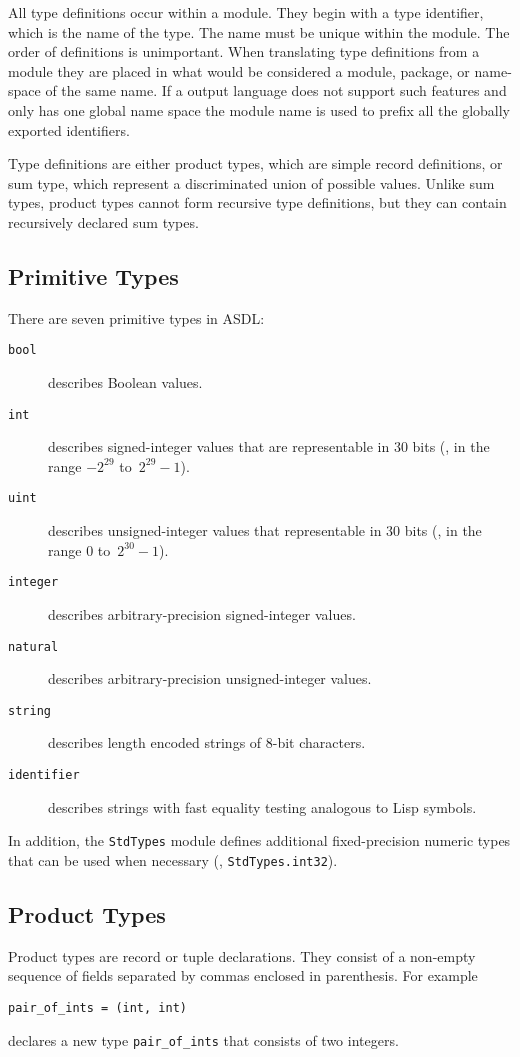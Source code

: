 All type definitions occur within a module.  They begin with a type
identifier, which is the name of the type. The name must be unique within the
module. The order of definitions is unimportant. When translating type
definitions from a module they are placed in what would be considered a
module, package, or name-space of the same name. If a output language does
not support such features and only has one global name space the module name
is used to prefix all the globally exported identifiers.

Type definitions are either product types, which are simple record definitions,
or sum type, which represent a discriminated union of possible values. Unlike
sum types, product types cannot form recursive type definitions, but they can
contain recursively declared sum types.

\subsection{Primitive Types}
There are seven primitive types in ASDL:
\begin{description}
  \item[\normalfont\texttt{\color{\cdColor}bool}] describes Boolean values.
  \item[\normalfont\texttt{\color{\cdColor}int}] describes signed-integer values that are representable in 30 bits
    (\ie{}, in the range ${-}2^{29}$ to~\mbox{$2^{29}-1$}).
  \item[\normalfont\texttt{\color{\cdColor}uint}] describes unsigned-integer values that representable in 30 bits
    (\ie{}, in the range $0$ to~$2^{30}-1$).
  \item[\normalfont\texttt{\color{\cdColor}integer}] describes arbitrary-precision signed-integer values.
  \item[\normalfont\texttt{\color{\cdColor}natural}] describes arbitrary-precision unsigned-integer values.
  \item[\normalfont\texttt{\color{\cdColor}string}] describes length encoded strings of 8-bit characters.
  \item[\normalfont\texttt{\color{\cdColor}identifier}] describes strings with fast equality testing
    analogous to Lisp symbols.
\end{description}%

In addition, the \lstinline!StdTypes! module defines additional fixed-precision numeric types
that can be used when necessary (\eg{}, \lstinline!StdTypes.int32!).

\subsection{Product Types}
Product types are record or tuple declarations. They consist of a non-empty 
sequence of fields separated by commas enclosed in parenthesis. For
example 
\begin{code}\begin{lstlisting}[language=ASDL] 
pair_of_ints = (int, int) 
\end{lstlisting}\end{code}%
declares a new type \lstinline[language=ASDL]!pair_of_ints! that consists of two integers.

